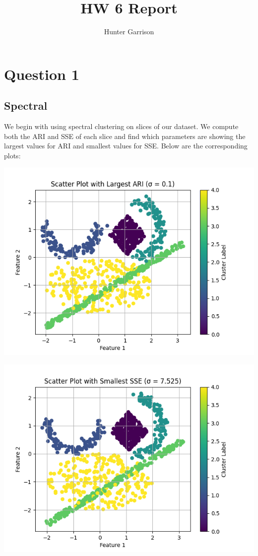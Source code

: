 \documentclass{article}
\title{HW 6 Report}
\author{Hunter Garrison}
\begin{document}
\maketitle

\section*{Question 1}

\subsection*{Spectral}
We begin with using spectral clustering on slices of our dataset. We compute both the ARI and SSE of each slice and find which parameters are showing the largest values for ARI and smallest values for SSE. Below are the corresponding plots:

\noindent
\begin{minipage}{.5\textwidth}
  \centering
  \includegraphics[width=0.9\linewidth]{Spectral_ARI.png}
\end{minipage}%
\begin{minipage}{.5\textwidth}
  \centering
  \includegraphics[width=0.9\linewidth]{Spectral_SSE.png}
\end{minipage}
\end{document}
